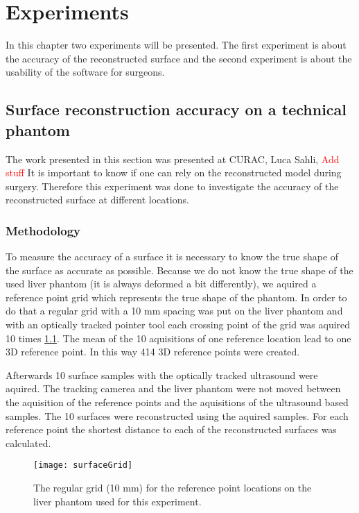 \chapter{Experiments}
In this chapter two experiments will be presented. The first experiment is about
the accuracy of the reconstructed surface and the second experiment is about the
usability of the software for surgeons.
\section{Surface reconstruction accuracy on a technical phantom}
\label{sec:SurfaceReconstructionAccuracy}
The work presented in this section was presented at CURAC, Luca Sahli,
\textcolor{red}{Add stuff}
 It is important to know if one can rely on the reconstructed model
during surgery. Therefore this experiment was done to investigate the accuracy of the reconstructed
surface at different locations.
\subsection{Methodology}
To measure the accuracy of a surface it is necessary to know the true shape of the
surface as accurate as possible. Because we do not know the true shape of the used liver phantom (it is
always deformed a bit differently), we aquired a reference point grid which
represents the true shape of the phantom. In order
to do that a regular grid with a 10 mm spacing was put on the liver phantom and
with an optically tracked pointer tool each crossing point of the grid was
aquired 10 times \ref{fig:surfaceGrid}. The mean of the 10 aquisitions of one reference location lead
to one 3D reference point. In this way 414 3D reference points were created.

Afterwards 10 surface samples with the optically tracked ultrasound were
aquired. The tracking camerea and the liver phantom were not moved between the
aquisition of the reference points and the aquisitions of the ultrasound based
samples. The 10 surfaces were reconstructed using the aquired samples. For each
reference point the shortest distance to each of the reconstructed surfaces was
calculated.

\begin{figure}[H]
  \centering
 \texttt{[image: surfaceGrid]}
 \caption{The regular grid (10 mm) for the reference point locations on the liver
   phantom used for this experiment.}
  \label{fig:surfaceGrid}
\end{figure}
